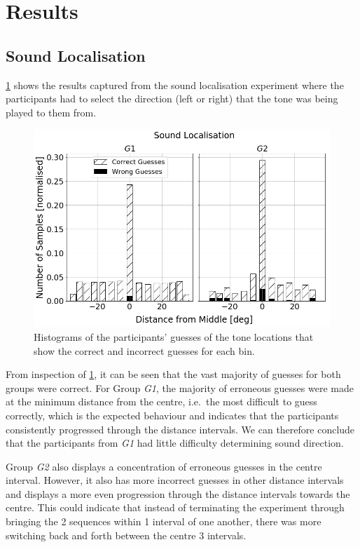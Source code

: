 \documentclass{article}
\begin{document}
\section{Results}\label{sec:results}

\subsection{Sound Localisation}

\cref{fig:sound-localisation} shows the results captured from the sound localisation experiment where the participants had to select the direction (left or right) that the tone was being played to them from. 

\begin{figure}
  \centering
  \includegraphics[width=1.0\textwidth]{figures/sound_localisation.png}
  \caption{Histograms of the participants' guesses of the tone locations that show the correct and incorrect guesses for each bin. }\label{fig:sound-localisation}
\end{figure}

From inspection of \cref{fig:sound-localisation}, it can be seen that the vast majority of guesses for both groups were correct.
For Group \textit{G1}, the majority of erroneous guesses were made at the minimum distance from the centre, i.e.\ the most difficult to guess correctly, which is the expected behaviour and indicates that the participants consistently progressed through the distance intervals.
We can therefore conclude that the participants from \textit{G1} had little difficulty determining sound direction.

Group \textit{G2} also displays a concentration of erroneous guesses in the centre interval.
However, it also has more incorrect guesses in other distance intervals and displays a more even progression through the distance intervals towards the centre.
This could indicate that instead of terminating the experiment through bringing the 2 sequences within 1 interval of one another, there was more switching back and forth between the centre 3 intervals. 
\end{document}
